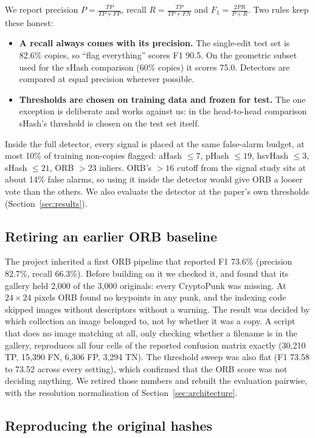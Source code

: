 We report precision $P=\frac{TP}{TP+FP}$, recall $R=\frac{TP}{TP+FN}$ and
$F_1=\frac{2PR}{P+R}$. Two rules keep these honest:
\begin{itemize}
  \item \textbf{A recall always comes with its precision.} The single-edit test set is 82.6\%
        copies, so ``flag everything'' scores F1 90.5. On the geometric subset used for the
        sHash comparison (60\% copies) it scores 75.0. Detectors are compared at equal
        precision wherever possible.
  \item \textbf{Thresholds are chosen on training data and frozen for test.} The one exception
        is deliberate and works against us: in the head-to-head comparison sHash's threshold
        is chosen on the test set itself.
\end{itemize}
Inside the full detector, every signal is placed at the same false-alarm budget, at most 10\%
of training non-copies flagged: aHash $\le 7$, pHash $\le 19$, hsvHash $\le 3$, sHash $\le 21$,
ORB $> 23$ inliers. ORB's $> 16$ cutoff from the signal study sits at about 14\% false alarms,
so using it inside the detector would give ORB a looser vote than the others. We also evaluate
the detector at the paper's own thresholds (Section~\ref{sec:results}).

\subsection{Retiring an earlier ORB baseline}
\label{sec:oldbaseline}

The project inherited a first ORB pipeline that reported F1 73.6\% (precision 82.7\%, recall
66.3\%). Before building on it we checked it, and found that its gallery held 2,000 of the
3,000 originals: every CryptoPunk was missing. At $24\times24$ pixels ORB found no keypoints
in any punk, and the indexing code skipped images without descriptors without a warning. The
result was decided by which collection an image belonged to, not by whether it was a copy. A
script that does no image matching at all, only checking whether a filename is in the
gallery, reproduces all four cells of the reported confusion matrix exactly (30,210 TP,
15,390 FN, 6,306 FP, 3,294 TN). The threshold sweep was also flat (F1 73.58 to 73.52 across
every setting), which confirmed that the ORB score was not deciding anything. We retired those
numbers and rebuilt the evaluation pairwise, with the resolution normalisation of
Section~\ref{sec:architecture}.

\subsection{Reproducing the original hashes}
\label{sec:reimpl}

